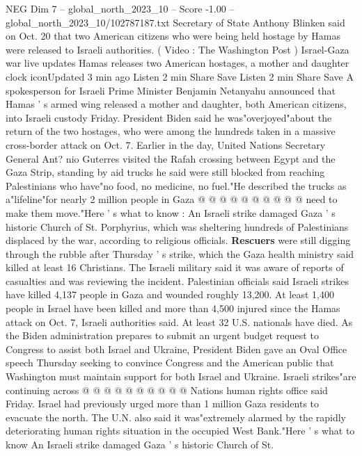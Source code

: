 \begin{textsample}{NEG Dim 7 – global\_north\_2023\_10 – Score -1.00 – global\_north\_2023\_10/102787187.txt}  \label{ex:f7_neg_206}
Secretary of State Anthony Blinken said on Oct. 20 that two American citizens who were being held hostage by Hamas were released to Israeli authorities. ( Video : The Washington Post ) Israel-Gaza war live updates Hamas releases two American hostages, a mother and daughter clock iconUpdated 3 min ago Listen 2 min Share Save Listen 2 min Share Save A spokesperson for Israeli Prime Minister Benjamin Netanyahu announced that Hamas ' s armed wing released a mother and daughter, both American citizens, into Israeli custody Friday.
President Biden said he was"overjoyed"about the return of the two hostages, who were among the hundreds taken in a massive cross-border attack on Oct. 7.
Earlier in the day, United Nations Secretary General Ant? nio Guterres visited the Rafah crossing between Egypt and the Gaza Strip, standing by aid trucks he said were still blocked from reaching Palestinians who have"no food, no medicine, no fuel."He described the trucks as a"lifeline"for nearly 2 million people in Gaza @ @ @ @ @ @ @ @ @ @ need to make them move."Here ' s what to know : An Israeli strike damaged Gaza ' s historic Church of St.
Porphyrius, which was sheltering hundreds of Palestinians displaced by the war, according to religious officials. \textbf{Rescuers} were still digging through the rubble after Thursday ' s strike, which the Gaza health ministry said killed at least 16 Christians.
The Israeli military said it was aware of reports of casualties and was reviewing the incident.
Palestinian officials said Israeli strikes have killed 4,137 people in Gaza and wounded roughly 13,200.
At least 1,400 people in Israel have been killed and more than 4,500 injured since the Hamas attack on Oct. 7, Israeli authorities said.
At least 32 U.S. nationals have died.
As the Biden administration prepares to submit an urgent budget request to Congress to assist both Israel and Ukraine, President Biden gave an Oval Office speech Thursday seeking to convince Congress and the American public that Washington must maintain support for both Israel and Ukraine.
Israeli strikes"are continuing across @ @ @ @ @ @ @ @ @ @ Nations human rights office said Friday.
Israel had previously urged more than 1 million Gaza residents to evacuate the north.
The U.N. also said it was"extremely alarmed by the rapidly deteriorating human rights situation in the occupied West Bank."Here ' s what to know An Israeli strike damaged Gaza ' s historic Church of St.

\end{textsample}
